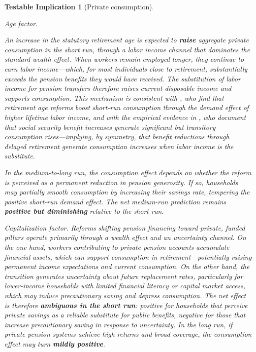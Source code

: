 \documentclass[11pt,english,a4paper, twoside, authoryear]{article}
\newtheorem{testable}{Testable Implication}}
\begin{document}
\begin{testable}[Private consumption]\label{test:conso}

\textit{Age factor.} %

An increase in the statutory retirement age is expected to \textbf{raise} aggregate private consumption in the short run, through a labor income channel that dominates the standard wealth effect. When workers remain employed longer, they continue to earn labor income---which, for most individuals close to retirement, substantially exceeds the pension benefits they would have received. The substitution of labor income for pension transfers therefore raises current disposable income and supports consumption. This mechanism is consistent with \citet{KaramMuirPereiraTuladhar2010}, who find that retirement age reforms boost short-run consumption through the demand effect of higher lifetime labor income, and with the empirical evidence in \citet{RomerRomer2016}, who document that social security benefit increases generate significant but transitory consumption rises---implying, by symmetry, that benefit reductions through delayed retirement generate consumption increases when labor income is the substitute.

In the medium-to-long run, the consumption effect depends on whether the reform is perceived as a permanent reduction in pension generosity. If so, households may partially smooth consumption by increasing their savings rate, tempering the positive short-run demand effect. The net medium-run prediction remains \textbf{positive but diminishing} relative to the short run.

\textit{Capitalization factor.} Reforms shifting pension financing toward private, funded pillars operate primarily through a wealth effect and an uncertainty channel. On the one hand, workers contributing to private pension accounts accumulate financial assets, which can support consumption in retirement---potentially raising permanent income expectations and current consumption. On the other hand, the transition generates uncertainty about future replacement rates, particularly for lower-income households with limited financial literacy or capital market access, which may induce precautionary saving and depress consumption. The net effect is therefore \textbf{ambiguous in the short run}: positive for households that perceive private savings as a reliable substitute for public benefits, negative for those that increase precautionary saving in response to uncertainty. In the long run, if private pension systems achieve high returns and broad coverage, the consumption effect may turn \textbf{mildly positive}.


\end{testable}
\end{document}
